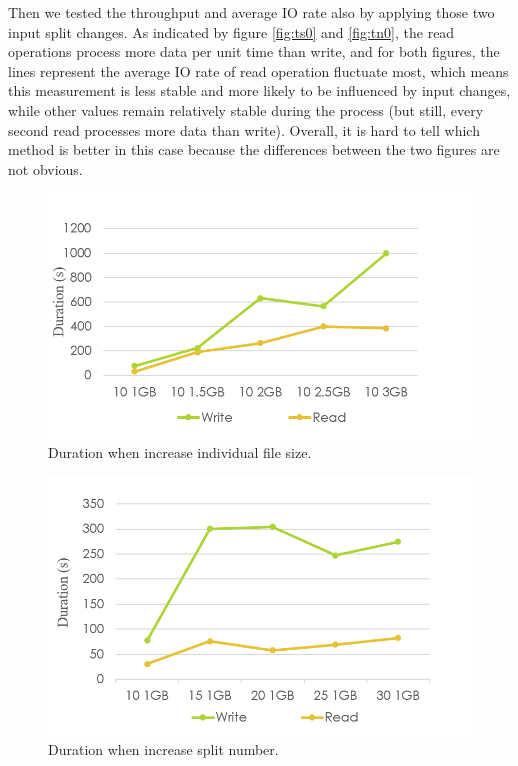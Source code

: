 \documentclass[11pt,twocolumn]{article}
\begin{document}
Then we tested the throughput and average IO rate also by applying those two input split changes. As indicated by figure \ref{fig:ts0} and \ref{fig:tn0}, the read operations process more data per unit time than write, and for both figures, the lines represent the average IO rate of read operation fluctuate most, which means this measurement is less stable and more likely to be influenced by input changes, while other values remain relatively stable during the process (but still, every second read processes more data than write). Overall, it is hard to tell which method is better in this case because the differences between the two figures are not obvious.
\begin{figure}[htp]
    \centering
        \includegraphics[width=\linewidth]{ds}
        \caption{Duration when increase individual file size.}
        \label{fig:ds}
\end{figure}
\begin{figure}[htp]
    \centering
        \includegraphics[width=\linewidth]{dn}
        \caption{Duration when increase split number.}
        \label{fig:dn}
\end{figure}
\end{document}
